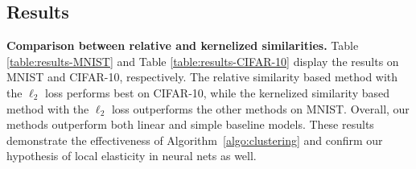 \begin{table}[t]
\centering
{}
\caption{Classification accuracy of Algorithm \ref{algo:clustering} and other methods on the CIFAR-10 dataset.}
\label{table:results-CIFAR-10}
\end{table}


\subsection{Results}
\label{subsec:results}
{\bf Comparison between relative and kernelized similarities.} Table \ref{table:results-MNIST} and Table \ref{table:results-CIFAR-10} display the results on MNIST and CIFAR-10, respectively. The relative similarity based method with the $\ell_2$ loss performs best on CIFAR-10, while the kernelized similarity based method with the $\ell_2$ loss outperforms the other methods on MNIST. Overall, our methods outperform both linear and simple baseline models. These results demonstrate the effectiveness of Algorithm~\ref{algo:clustering} and confirm our hypothesis of local elasticity in neural nets as well.

